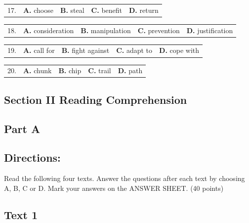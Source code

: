 \documentclass[UTF8,11pt]{ctexart}
\begin{document}
\noindent\begin{tabularx}{\linewidth}{@{}lXXXX@{}}17. & \textbf{A.} choose & \textbf{B.} steal & \textbf{C.} benefit & \textbf{D.} return\\\end{tabularx}\par

\noindent\begin{tabularx}{\linewidth}{@{}lXXXX@{}}18. & \textbf{A.} consideration & \textbf{B.} manipulation & \textbf{C.} prevention & \textbf{D.} justification\\\end{tabularx}\par

\noindent\begin{tabularx}{\linewidth}{@{}lXXXX@{}}19. & \textbf{A.} call for & \textbf{B.} fight against & \textbf{C.} adapt to & \textbf{D.} cope with\\\end{tabularx}\par

\noindent\begin{tabularx}{\linewidth}{@{}lXXXX@{}}20. & \textbf{A.} chunk & \textbf{B.} chip & \textbf{C.} trail & \textbf{D.} path\\\end{tabularx}\par

\subsection*{\textbf{Section II Reading Comprehension}}


\subsection*{\textbf{Part A}}


\subsection*{\textbf{Directions:}}


Read the following four texts. Answer the questions after each text by choosing A, B, C or D. Mark your answers on the ANSWER SHEET. (40 points)


\subsection*{\textbf{Text 1}}
\end{document}
